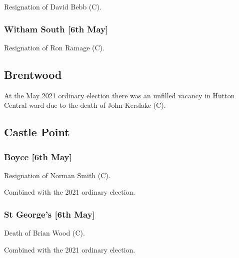 \documentclass[a4paper,openany]{book}
\begin{document}
\begin{resultsiii}
Resignation of David Bebb (C).

\subsubsection*{Witham South \hspace*{\fill}\nolinebreak[1]%
	\enspace\hspace*{\fill}
	[6th May]}


Resignation of Ron Ramage (C).

\subsection*{Brentwood}

At the May 2021 ordinary election there was an unfilled vacancy in Hutton Central ward due to the death of John Kerslake (C).

\subsection*{Castle Point}

\subsubsection*{Boyce \hspace*{\fill}\nolinebreak[1]%
	\enspace\hspace*{\fill}
	[6th May]}


Resignation of Norman Smith (C).

Combined with the 2021 ordinary election.

\subsubsection*{St George's \hspace*{\fill}\nolinebreak[1]%
	\enspace\hspace*{\fill}
	[6th May]}


Death of Brian Wood (C).

Combined with the 2021 ordinary election.


\end{resultsiii}
\end{document}
